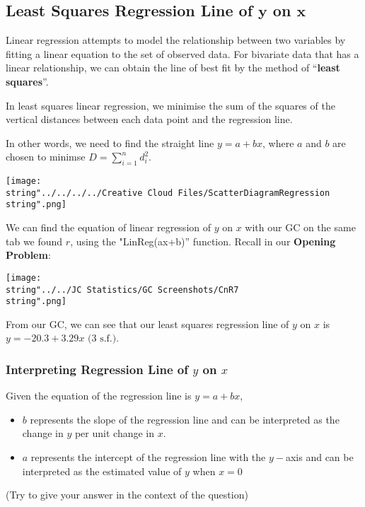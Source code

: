 \documentclass[11pt,a4paper]{book}
\begin{document}
\subsection{Least Squares Regression Line of $\boldsymbol{y}$ on $\boldsymbol{x}$}

Linear regression attempts to model the relationship between two variables
by fitting a linear equation to the set of observed data. For bivariate
data that has a linear relationship, we can obtain the line of best
fit by the method of ``\textbf{least squares}''.

\begin{minipage}[t]{.5\textwidth}

In least squares linear regression, we minimise the sum of the squares
of the vertical distances between each data point and the regression
line.

\medskip

In other words, we need to find the straight line $y=a+bx$, where
$a$ and $b$ are chosen to minimse ${\displaystyle D=\sum_{i=1}^{n}d_{i}^{2}}$.

\end{minipage}
\begin{minipage}[t]{.5\textwidth}
\begin{center}
\texttt{[image: \\string"../../../../Creative Cloud Files/ScatterDiagramRegression\\string".png]}
\par\end{center}

\end{minipage}

We can find the equation of linear regression of $y$ on $x$ with
our GC on the same tab we found $r$, using the "LinReg(ax+b)'' function.
Recall in our \textbf{Opening Problem}:
\begin{center}
\texttt{[image: \\string"../../JC Statistics/GC Screenshots/CnR7\\string".png]}
\par\end{center}

From our GC, we can see that our least squares regression line of
$y$ on $x$ is $y=-20.3+3.29x\text{ (3 s.f.)}$.

\subsubsection{Interpreting Regression Line of $y$ on $x$}

Given the equation of the regression line is $y=a+bx$,
\begin{itemize}
\item $b$ represents the slope of the regression line and can be interpreted
as the change in $y$ per unit change in $x$.
\item $a$ represents the intercept of the regression line with the $y-$axis
and can be interpreted as the estimated value of $y$ when $x=0$
\end{itemize}
(Try to give your answer in the context of the question)
\end{document}
